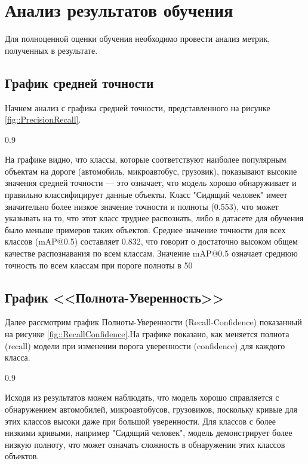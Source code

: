 \chapter{Анализ результатов обучения}

Для полноценной оценки обучения необходимо провести анализ метрик, полученных в
результате.

\section{График средней точности}

Начнем анализ с графика средней точности, представленного на рисунке 
\ref{fig::PrecisionRecall}. 

{0.9}

На графике видно, что классы, которые соответствуют наиболее популярным объектам
на дороге (автомобиль, микроавтобус, грузовик), показывают высокие значения 
средней точности --- это означает, что модель хорошо обнаруживает и правильно 
классифицирует данные объекты. Класс "Сидящий человек" имеет значительно более
низкое значение точности и полноты (0.553), что может указывать на то, что этот
класс труднее распознать, либо в датасете для обучения было меньше примеров таких
объектов. Среднее значение точности для всех классов (mAP@0.5) составляет 0.832,
что говорит о достаточно высоком общем качестве распознавания по всем классам.
Значение mAP@0.5 означает среднюю точность по всем классам при пороге полноты в 50%

\section{График <<Полнота-Уверенность>>}

Далее рассмотрим график Полноты-Уверенности (Recall-Confidence) показанный на 
рисунке \ref{fig::RecallConfidence}.На графике показано, как меняется полнота
(recall) модели при изменении порога уверенности (confidence) для каждого класса.

{0.9}

Исходя из результатов можем наблюдать, что модель хорошо справляется с обнаружением
автомобилей, микроавтобусов, грузовиков, поскольку кривые для этих классов высоки
даже при большой уверенности. Для классов с более низкими кривыми, например "Сидящий
человек", модель демонстрирует более низкую полноту, что может означать сложность в
обнаружении этих классов объектов.

